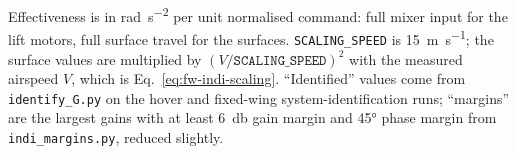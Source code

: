 \documentclass{article}
\begin{document}
Effectiveness is in \si{\radian\per\second\squared} per unit normalised command: full mixer input for the lift motors, full surface travel for the surfaces. \texttt{SCALING\_SPEED} is \SI{15}{\meter\per\second}; the surface values are multiplied by $(V/\texttt{SCALING\_SPEED})^2$ with the measured airspeed $V$, which is Eq.~\eqref{eq:fw-indi-scaling}. ``Identified'' values come from \texttt{identify\_\allowbreak{}G.py} on the hover and fixed-wing system-identification runs; ``margins'' are the largest gains with at least \SI{6}{\decibel} gain margin and \ang{45} phase margin from \texttt{indi\_\allowbreak{}margins.py}, reduced slightly.

\begin{table}[H]
    \centering
    \caption{Other settings referred to in the text, as flown (\texttt{stock\_\allowbreak{}pid.param}).}
    \label{tab:appendix-other-params}
\end{table}
\end{document}

